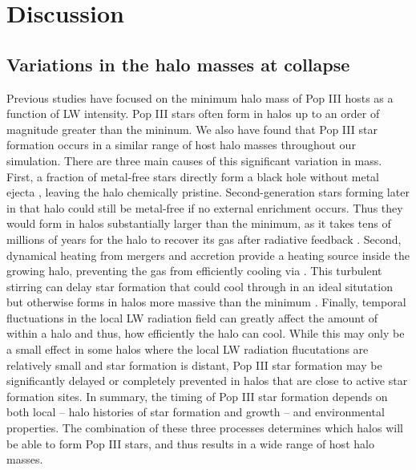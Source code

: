 \documentclass[a4paper,fleqn,usenatbib]{mnras}
\begin{document}
\section{Discussion}

\subsection{Variations in the halo masses at collapse}
Previous studies have focused on the minimum halo mass of Pop III hosts as a function of LW intensity. Pop III stars often form in halos up to an order of magnitude greater than the mininum. We also have found that Pop III star formation occurs in a similar range of host halo masses throughout our simulation. There are three main causes of this significant variation in mass. First, a fraction of metal-free stars directly form a black hole without metal ejecta \citep{Heger03}, leaving the halo chemically pristine.  Second-generation stars forming later in that halo could still be metal-free if no external enrichment occurs. Thus they would form in halos substantially larger than the minimum, as it takes tens of millions of years for the halo to recover its gas after radiative feedback \citep{Muratov13, Jeon14_Recovery}.  Second, dynamical heating from mergers and accretion provide a heating source inside the growing halo, preventing the gas from efficiently cooling via \hh{}. This turbulent stirring can delay star formation that could cool through \hh{} in an ideal situtation but otherwise forms in halos more massive than the minimum \citep{Yoshida03, Wise19}. Finally, temporal fluctuations in the local LW radiation field can greatly affect the amount of \hh{} within a halo and thus, how efficiently the halo can cool. While this may only be a small effect in some halos where the local LW radiation flucutations are relatively small and star formation is distant, Pop III star formation may be significantly delayed or completely prevented in halos that are close to active star formation sites.  In summary, the timing of Pop III star formation depends on both local -- halo histories of star formation and growth -- and environmental properties.  The combination of these three processes determines which halos will be able to form Pop III stars, and thus results in a wide range of host halo masses. 
\end{document}
